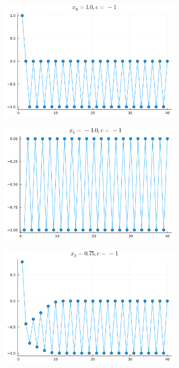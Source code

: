 \documentclass{article}
\def\v{0.47}
\begin{document}
\begin{figure}[H]
\begin{subfigure}[b]{\v\linewidth}
		\end{subfigure}
		\begin{subfigure}[b]{\v\linewidth}
			\includegraphics[width=\linewidth]{graphs/4.png}
		\end{subfigure}
		\begin{subfigure}[b]{\v\linewidth}
			\includegraphics[width=\linewidth]{graphs/5.png}
		\end{subfigure}
		\begin{subfigure}[b]{\v\linewidth}
			\includegraphics[width=\linewidth]{graphs/6.png}

\end{subfigure}
\end{figure}
\end{document}
